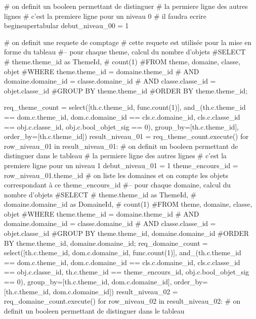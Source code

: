 \documentclass[12pt,titlepage,oneside]{book}
\begin{document}
\begin{lbdpython}

# on definit un booleen permettant de distinguer
# la permiere ligne des autres lignes
# c'est la premiere ligne pour un niveau 0
# il faudra ecrire begin{supertabular}
debut_niveau_00 = 1


# on definit une requete de comptage
# cette requete est utilisée pour la mise en forme du tableau
#-- pour chaque theme, calcul du nombre d'objets
#SELECT
#   theme.theme_id as ThemeId,
#   count(1)
#FROM theme, domaine, classe, objet
#WHERE theme.theme_id = domaine.theme_id 
#  AND domaine.domaine_id = classe.domaine_id
#  AND classe.classe_id = objet.classe_id
#GROUP BY theme.theme_id
#ORDER BY theme.theme_id;

req_theme_count = select([th.c.theme_id, func.count(1)],
                  and_(th.c.theme_id == dom.c.theme_id,
                       dom.c.domaine_id == cls.c.domaine_id,
                       cls.c.classe_id == obj.c.classe_id,
                       obj.c.bool_objet_sig == 0),
                  group_by=[th.c.theme_id],
                  order_by=[th.c.theme_id])
result_niveau_01 = req_theme_count.execute()
for row_niveau_01 in result_niveau_01:
   # on definit un booleen permettant de distinguer dans le tableau
   # la permiere ligne des autres lignes
   # c'est la premiere ligne pour un niveau 1
   debut_niveau_01 = 1
   theme_encours_id = row_niveau_01.theme_id
   # on liste les domaines et on compte les objets correspondant à ce theme_encours_id
   #-- pour chaque domaine, calcul du nombre d'objets
   #SELECT
   #   theme.theme_id as ThemeId,
   #   domaine.domaine_id as DomaineId,
   #   count(1)
   #FROM theme, domaine, classe, objet
   #WHERE theme.theme_id = domaine.theme_id
   #  AND domaine.domaine_id = classe.domaine_id
   #  AND classe.classe_id = objet.classe_id
   #GROUP BY theme.theme_id, domaine.domaine_id
   #ORDER BY theme.theme_id, domaine.domaine_id;
   req_domaine_count = select([th.c.theme_id, dom.c.domaine_id, func.count(1)],
                       and_(th.c.theme_id == dom.c.theme_id,
                            dom.c.domaine_id == cls.c.domaine_id,
                            cls.c.classe_id == obj.c.classe_id,
                            th.c.theme_id == theme_encours_id,
                            obj.c.bool_objet_sig == 0),
                       group_by=[th.c.theme_id, dom.c.domaine_id],
                       order_by=[th.c.theme_id, dom.c.domaine_id])
   result_niveau_02 = req_domaine_count.execute()
   for row_niveau_02 in result_niveau_02:
      # on definit un booleen permettant de distinguer dans le tableau

\end{lbdpython}
\end{document}

